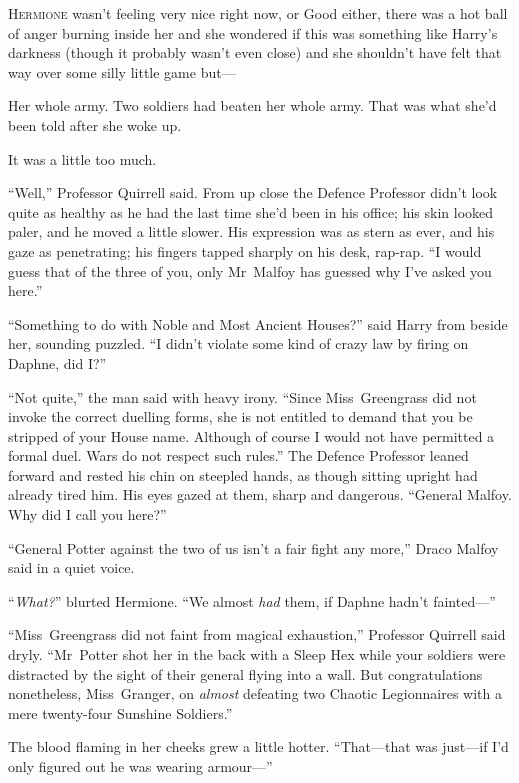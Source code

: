 
\lettrine{H}{ermione} wasn’t feeling very nice right now, or Good either, there was a hot ball of anger burning inside her and she wondered if this was something like Harry’s darkness (though it probably wasn’t even close) and she shouldn’t have felt that way over some silly little game but—

Her whole army. Two soldiers had beaten her whole army. That was what she’d been told after she woke up.

It was a little too much.

“Well,” Professor Quirrell said. From up close the Defence Professor didn’t look quite as healthy as he had the last time she’d been in his office; his skin looked paler, and he moved a little slower. His expression was as stern as ever, and his gaze as penetrating; his fingers tapped sharply on his desk, rap-rap.
“I would guess that of the three of you, only Mr~Malfoy has guessed why I’ve asked you here.”

“Something to do with Noble and Most Ancient Houses?” said Harry from beside her, sounding puzzled.
“I didn’t violate some kind of crazy law by firing on Daphne, did I?”

“Not quite,” the man said with heavy irony.
“Since Miss~Greengrass did not invoke the correct duelling forms, she is not entitled to demand that you be stripped of your House name. Although of course I would not have permitted a formal duel. Wars do not respect such rules.” The Defence Professor leaned forward and rested his chin on steepled hands, as though sitting upright had already tired him. His eyes gazed at them, sharp and dangerous.
“General Malfoy. Why did I call you here?”

“General Potter against the two of us isn’t a fair fight any more,” Draco Malfoy said in a quiet voice.

“\emph{What?}” blurted Hermione.
“We almost \emph{had} them, if Daphne hadn’t fainted—”

“Miss~Greengrass did not faint from magical exhaustion,” Professor Quirrell said dryly.
“Mr~Potter shot her in the back with a Sleep Hex while your soldiers were distracted by the sight of their general flying into a wall. But congratulations nonetheless, Miss~Granger, on \emph{almost} defeating two Chaotic Legionnaires with a mere twenty-four Sunshine Soldiers.”

The blood flaming in her cheeks grew a little hotter.
“That—that was just—if I’d only figured out he was wearing armour—”


